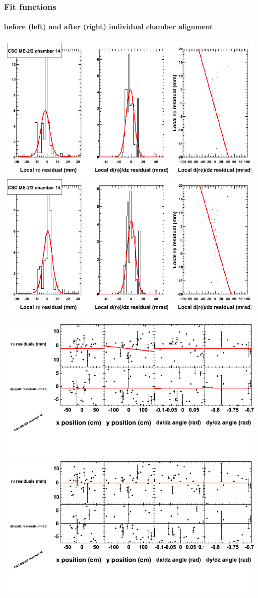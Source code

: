 \documentclass[compress]{beamer}
\begin{document}
\begin{frame}
\frametitle{Fit functions}
\framesubtitle{before (left) and after (right) individual chamber alignment}
\includegraphics[width=0.5\linewidth]{ringfits_3dof/beforefit_MEm22_14_bellcurve.png} \includegraphics[width=0.5\linewidth]{ringfits_3dof/afterfit_MEm22_14_bellcurve.png}

\includegraphics[width=0.5\linewidth]{ringfits_3dof/beforefit_MEm22_14_polynomials.png} \includegraphics[width=0.5\linewidth]{ringfits_3dof/afterfit_MEm22_14_polynomials.png}
\end{frame}
\end{document}
